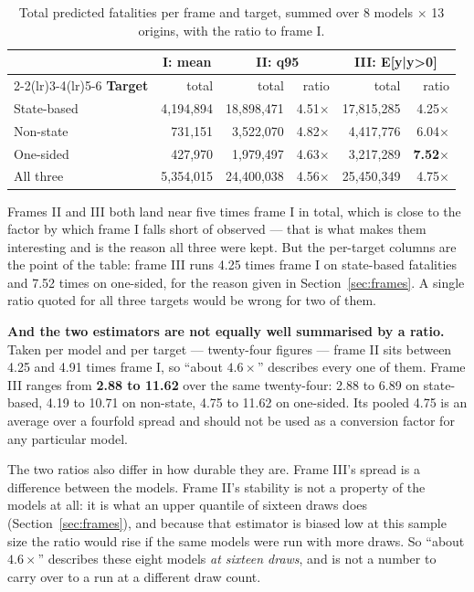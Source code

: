 \begin{table}[h!]
\centering
\small
\renewcommand{\arraystretch}{1.2}
\caption{Total predicted fatalities per frame and target, summed over 8 models $\times$ 13 origins,
with the ratio to frame I.}
\label{tab:frameratios}
\begin{tabular}{@{}lrrrrr@{}}
\toprule
 & \multicolumn{1}{c}{\textbf{I: mean}} & \multicolumn{2}{c}{\textbf{II: q95}}
 & \multicolumn{2}{c}{\textbf{III: E[y|y>0]}} \\
\cmidrule(lr){2-2}\cmidrule(lr){3-4}\cmidrule(lr){5-6}
\textbf{Target} & total & total & ratio & total & ratio \\ \midrule
State-based & 4,194,894 & 18,898,471 & 4.51$\times$ & 17,815,285 & 4.25$\times$ \\
Non-state   &   731,151 &  3,522,070 & 4.82$\times$ &  4,417,776 & 6.04$\times$ \\
One-sided   &   427,970 &  1,979,497 & 4.63$\times$ &  3,217,289 & \textbf{7.52}$\times$ \\ \midrule
All three   & 5,354,015 & 24,400,038 & 4.56$\times$ & 25,450,349 & 4.75$\times$ \\
\bottomrule
\end{tabular}
\end{table}

\noindent Frames II and III both land near five times frame I in total, which is close to the
factor by which frame I falls short of observed --- that is what makes them interesting and is the
reason all three were kept. But the per-target columns are the point of the table: frame III runs
4.25 times frame I on state-based fatalities and 7.52 times on one-sided, for the reason given in
Section~\ref{sec:frames}. A single ratio quoted for all three targets would be wrong for two of
them.

\textbf{And the two estimators are not equally well summarised by a ratio.} Taken per model and
per target --- twenty-four figures --- frame II sits between 4.25 and 4.91 times frame I, so
``about $4.6\times$'' describes every one of them. Frame III ranges from \textbf{2.88 to 11.62}
over the same twenty-four: 2.88 to 6.89 on state-based, 4.19 to 10.71 on non-state, 4.75 to 11.62
on one-sided. Its pooled 4.75 is an average over a fourfold spread and should not be used as a
conversion factor for any particular model.

The two ratios also differ in how durable they are. Frame III's spread is a difference between the
models. Frame II's stability is not a property of the models at all: it is what an upper quantile of
sixteen draws does (Section~\ref{sec:frames}), and because that estimator is biased low at this
sample size the ratio would rise if the same models were run with more draws. So
``about $4.6\times$'' describes these eight models \emph{at sixteen draws}, and is not a number to
carry over to a run at a different draw count.

